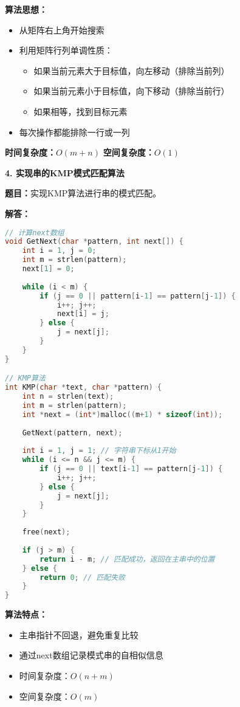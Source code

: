 \documentclass[12pt,a4paper]{amsart}
\begin{document}
\textbf{算法思想：}
\begin{itemize}
\item 从矩阵右上角开始搜索
\item 利用矩阵行列单调性质：
  \begin{itemize}
  \item 如果当前元素大于目标值，向左移动（排除当前列）
  \item 如果当前元素小于目标值，向下移动（排除当前行）
  \item 如果相等，找到目标元素
  \end{itemize}
\item 每次操作都能排除一行或一列
\end{itemize}

\textbf{时间复杂度：}$O(m+n)$
\textbf{空间复杂度：}$O(1)$

\textbf{4. 实现串的KMP模式匹配算法}

\textbf{题目：}实现KMP算法进行串的模式匹配。

\textbf{解答：}
\begin{lstlisting}[language=C++]
// 计算next数组
void GetNext(char *pattern, int next[]) {
    int i = 1, j = 0;
    int m = strlen(pattern);
    next[1] = 0;
    
    while (i < m) {
        if (j == 0 || pattern[i-1] == pattern[j-1]) {
            i++; j++;
            next[i] = j;
        } else {
            j = next[j];
        }
    }
}

// KMP算法
int KMP(char *text, char *pattern) {
    int n = strlen(text);
    int m = strlen(pattern);
    int *next = (int*)malloc((m+1) * sizeof(int));
    
    GetNext(pattern, next);
    
    int i = 1, j = 1; // 字符串下标从1开始
    while (i <= n && j <= m) {
        if (j == 0 || text[i-1] == pattern[j-1]) {
            i++; j++;
        } else {
            j = next[j];
        }
    }
    
    free(next);
    
    if (j > m) {
        return i - m; // 匹配成功，返回在主串中的位置
    } else {
        return 0; // 匹配失败
    }
}
\end{lstlisting}

\textbf{算法特点：}
\begin{itemize}
\item 主串指针不回退，避免重复比较
\item 通过next数组记录模式串的自相似信息
\item 时间复杂度：$O(n+m)$
\item 空间复杂度：$O(m)$
\end{itemize}
\end{document}

